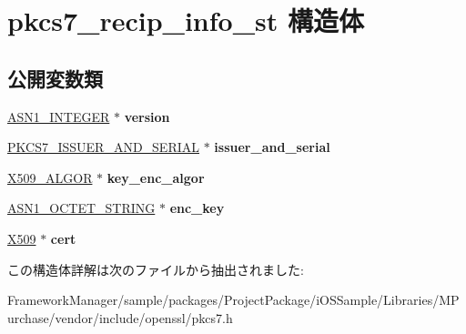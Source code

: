 \hypertarget{structpkcs7__recip__info__st}{}\section{pkcs7\+\_\+recip\+\_\+info\+\_\+st 構造体}
\label{structpkcs7__recip__info__st}
\subsection*{公開変数類}
\begin{DoxyCompactItemize}
\item 
\hypertarget{structpkcs7__recip__info__st_a2dab371fc11bb2b2a31c8d6ae805b7d4}{}\hyperlink{structasn1__string__st}{A\+S\+N1\+\_\+\+I\+N\+T\+E\+G\+E\+R} $\ast$ {\bfseries version}\label{structpkcs7__recip__info__st_a2dab371fc11bb2b2a31c8d6ae805b7d4}

\item 
\hypertarget{structpkcs7__recip__info__st_a518df74b0610022385c23e30d659c003}{}\hyperlink{structpkcs7__issuer__and__serial__st}{P\+K\+C\+S7\+\_\+\+I\+S\+S\+U\+E\+R\+\_\+\+A\+N\+D\+\_\+\+S\+E\+R\+I\+A\+L} $\ast$ {\bfseries issuer\+\_\+and\+\_\+serial}\label{structpkcs7__recip__info__st_a518df74b0610022385c23e30d659c003}

\item 
\hypertarget{structpkcs7__recip__info__st_ad337ba9cf15d47888dfff734116dbed5}{}\hyperlink{struct_x509__algor__st}{X509\+\_\+\+A\+L\+G\+O\+R} $\ast$ {\bfseries key\+\_\+enc\+\_\+algor}\label{structpkcs7__recip__info__st_ad337ba9cf15d47888dfff734116dbed5}

\item 
\hypertarget{structpkcs7__recip__info__st_a1dd5082129a2141e6a6ea4accc3ec700}{}\hyperlink{structasn1__string__st}{A\+S\+N1\+\_\+\+O\+C\+T\+E\+T\+\_\+\+S\+T\+R\+I\+N\+G} $\ast$ {\bfseries enc\+\_\+key}\label{structpkcs7__recip__info__st_a1dd5082129a2141e6a6ea4accc3ec700}

\item 
\hypertarget{structpkcs7__recip__info__st_a6be787ca74a954b3bb37d84d46aa9418}{}\hyperlink{structx509__st}{X509} $\ast$ {\bfseries cert}\label{structpkcs7__recip__info__st_a6be787ca74a954b3bb37d84d46aa9418}

\end{DoxyCompactItemize}


この構造体詳解は次のファイルから抽出されました\+:\begin{DoxyCompactItemize}
\item 
Framework\+Manager/sample/packages/\+Project\+Package/i\+O\+S\+Sample/\+Libraries/\+M\+Purchase/vendor/include/openssl/pkcs7.\+h\end{DoxyCompactItemize}
